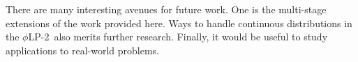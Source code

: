 \documentclass[ijoc,letterpaper]{informs3} %
\newcommand{\plp}{$\phi$LP-2}
\begin{document}
There are many interesting avenues for future work. 
One is the multi-stage extensions of the work provided here. 
Ways to handle continuous distributions in the \plp\ also merits further research. 
Finally, it would be useful to study applications to real-world problems.



%
%
%








\end{document}

